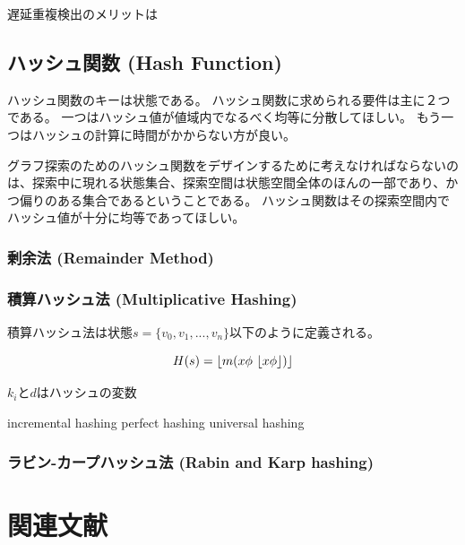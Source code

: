 \documentclass[10pt]{book}
\DeclarePairedDelimiter\floor{\lfloor}{\rfloor}
\begin{document}
遅延重複検出のメリットは


\subsection{ハッシュ関数 (Hash Function)}
\label{sec:hash-function}

ハッシュ関数のキーは状態である。
ハッシュ関数に求められる要件は主に２つである。
一つはハッシュ値が値域内でなるべく均等に分散してほしい。
もう一つはハッシュの計算に時間がかからない方が良い。

グラフ探索のためのハッシュ関数をデザインするために考えなければならないのは、探索中に現れる状態集合、探索空間は状態空間全体のほんの一部であり、かつ偏りのある集合であるということである。
ハッシュ関数はその探索空間内でハッシュ値が十分に均等であってほしい。


\subsubsection{剰余法 (Remainder Method)}

\subsubsection{積算ハッシュ法 (Multiplicative Hashing)}
積算ハッシュ法は状態$s = \{v_0, v_1,...,v_n\}$以下のように定義される。

\begin{equation}
	H(s) = \floor{m (x \phi \ \floor{x \phi})}
\end{equation}

$k_i$と$d$はハッシュの変数

incremental hashing
perfect hashing
universal hashing

\subsubsection{ラビン-カープハッシュ法 (Rabin and Karp hashing)}




\section{関連文献}
\end{document}
